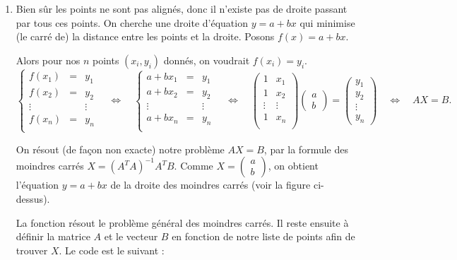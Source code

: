 \documentclass[class=report,crop=false]{standalone}
\begin{document}
\begin{enumerate}
  \item Bien sûr les points ne sont pas alignés, donc il n'existe 
  pas de droite passant par tous ces points.
  On cherche une droite d'équation $y = a +bx$ qui minimise (le carré de) la distance
  entre les points et la droite. Posons $f(x) = a + bx$.
  
  Alors pour nos $n$ points $(x_i,y_i)$ donnés, on voudrait $f(x_i)=y_i$. 
  $$
  \left\{ 
  \begin{array}{ccl}
  f(x_1) &=& y_1 \\
  f(x_2) &=& y_2 \\
  \vdots && \vdots\\
  f(x_n) &=& y_n \\
  \end{array}
  \right.
  \quad
  \iff
  \quad
  \left\{ 
  \begin{array}{ccl}
  a +b x_1 &=& y_1 \\
  a +b x_2 &=& y_2 \\
  \vdots && \vdots\\
  a +b x_n &=& y_n \\
  \end{array}
  \right.
  \quad
  \iff
  \quad 
  \begin{pmatrix}
  1 & x_1 \\
  1 & x_2 \\
  \vdots & \vdots \\
  1 & x_n \\  
  \end{pmatrix}
  \begin{pmatrix}
  a \\ b  
  \end{pmatrix}
  = 
  \begin{pmatrix}
  y_1\\
  y_2 \\
  \vdots \\
  y_n
  \end{pmatrix}
  \quad
  \iff
  \quad 
  AX = B.
  $$
  
  On résout (de façon non exacte) notre problème $AX = B$, par la formule des moindres carrés
  $X = (A^TA)^{-1} A^T B$. Comme $X = \left(\begin{smallmatrix}a\\b\end{smallmatrix}\right)$,
  on obtient l'équation $y=a+bx$ de la droite des moindres carrés (voir la figure ci-dessus).
  
   La fonction  résout le problème général des moindres carrés.
  Il reste ensuite à définir la matrice $A$ et le vecteur $B$ en fonction de notre liste de points
  afin de trouver $X$.
  Le code est le suivant :
  


\end{enumerate}
\end{document}
